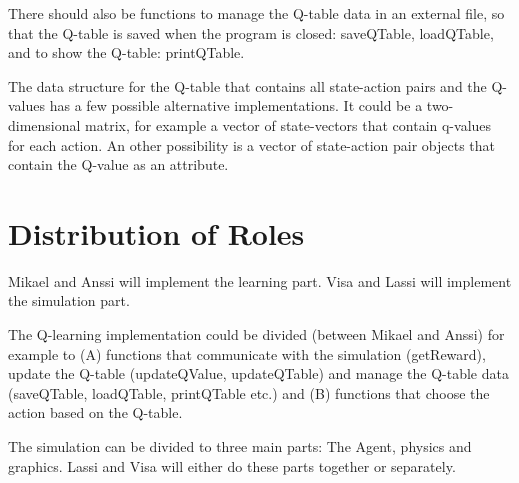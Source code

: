 \documentclass{article}
\begin{document}
There should also be functions to manage the Q-table data in an external file,
so that the Q-table is saved when the program is closed: saveQTable, loadQTable,
and to show the Q-table: printQTable.

The data structure for the Q-table that contains all state-action pairs
and the Q-values has a few possible alternative
implementations. It could be a two-dimensional matrix, for example a
vector of state-vectors that contain q-values for each action. An other
possibility is a vector
of state-action pair objects that contain the Q-value as an attribute.



\section{Distribution of Roles}
Mikael and Anssi will implement the learning part. Visa and Lassi will
implement the simulation part.

The Q-learning implementation could be divided (between Mikael and Anssi) for
example to (A) functions that communicate with the simulation (getReward), update
the Q-table (updateQValue, updateQTable) and manage the Q-table data (saveQTable,
loadQTable, printQTable etc.) and (B) functions that choose the action based on
the Q-table.

The simulation can be divided to three main parts: The Agent, physics and graphics.
Lassi and Visa will either do these parts together or separately.
\end{document}
